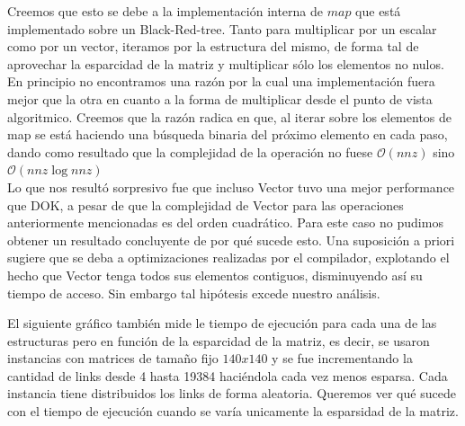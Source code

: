 Creemos que esto se debe a la implementación interna de $map$ que está implementado sobre un Black-Red-tree. Tanto para multiplicar por un escalar como por un vector, iteramos por la estructura del mismo, de forma tal de aprovechar la esparcidad de la matriz y multiplicar sólo los elementos no nulos. En principio no encontramos una razón por la cual una implementación fuera mejor que la otra en cuanto a la forma de multiplicar desde el punto de vista algoritmico. Creemos que la razón radica en que, al iterar sobre los elementos de map se está haciendo una búsqueda binaria del próximo elemento en cada paso, dando como resultado que la complejidad de la operación no fuese $\mathcal{O}(nnz)$ sino $\mathcal{O}(nnz\log{}nnz)$ \\

Lo que nos resultó sorpresivo fue que incluso Vector tuvo una mejor performance que DOK, a pesar de que la complejidad de Vector para las operaciones anteriormente mencionadas es del orden cuadrático. Para este caso no pudimos obtener un resultado concluyente de por qué sucede esto. Una suposición a priori sugiere que se deba a optimizaciones realizadas por el compilador, explotando el hecho que Vector tenga todos sus elementos contiguos, disminuyendo así su tiempo de acceso. Sin embargo tal hipótesis excede nuestro análisis.\\

\newpage

El siguiente gráfico también mide le tiempo de ejecución para cada una de las estructuras pero en función de la esparcidad de la matriz, es decir, se usaron instancias con matrices de tamaño fijo $140x140$ y se fue incrementando la cantidad de links desde 4 hasta 19384 haciéndola cada vez menos esparsa. Cada instancia tiene distribuidos los links de forma aleatoria. Queremos ver qué sucede con el tiempo de ejecución cuando se varía unicamente la esparsidad de la matriz. \\

